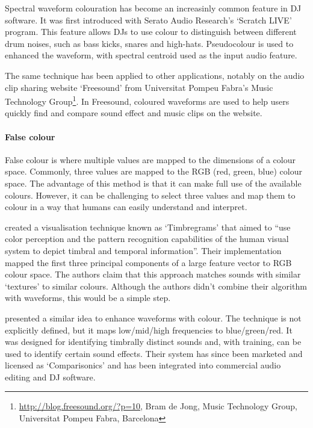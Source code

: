 Spectral waveform colouration has become an increasinly common feature in DJ software. It was first introduced with
Serato Audio Research's `Scratch LIVE' program.
This feature allows DJs to use colour to distinguish between different drum noises, such as bass kicks, snares and
high-hats. Pseudocolour is used to enhanced the waveform, with spectral centroid used as the input audio feature.

The same technique has been applied to other applications, notably on the audio clip sharing website `Freesound' from
Universitat Pompeu Fabra's Music Technology Group\footnote{\url{http://blog.freesound.org/?p=10}, Bram de Jong, Music
  Technology Group, Universitat Pompeu Fabra, Barcelona}. In Freesound, coloured waveforms are used to help users
quickly find and compare sound effect and music clips on the website.

\paragraph{False colour}\label{sec:background-falsecolour}
False colour is where multiple values are mapped to the dimensions of a colour space. Commonly, three values are
mapped to the RGB (red, green, blue) colour space.  The advantage of this method is that it can make full use of the
available colours.  However, it can be challenging to select three values and map them to colour in a way that humans
can easily understand and interpret.

\citet{Tzanetakis2000} created a visualisation technique known as `Timbregrams' that aimed to ``use color perception
and the pattern recognition capabilities of the human visual system to depict timbral and temporal information''. Their
implementation mapped the first three principal components of a large feature vector to RGB colour space. The authors
claim that this approach matches sounds with similar `textures' to similar colours.
Although the authors didn't combine their algorithm with waveforms, this would be a simple step.

\citet{Rice2005} presented a similar idea to enhance waveforms with colour. The technique is not
explicitly defined, but it maps low/mid/high frequencies to blue/green/red. It was designed for identifying
timbrally distinct sounds and, with training, can be used to identify certain sound effects. Their system has since
been marketed and licensed as `Comparisonics' and has been integrated into commercial audio editing and DJ
software.

